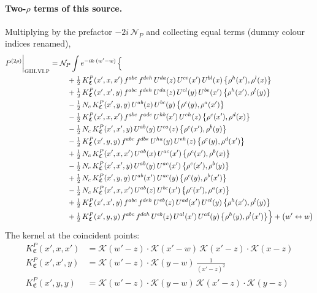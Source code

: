 \documentclass[10pt]{article}
\numberwithin{equation}{section}
\newcommand{\KK}{\mathcal K}
\newcommand{\NP}{\mathcal N_{P}}
\begin{document}
\paragraph{Two-$\rho$ terms of this source.} Multiplying by the prefactor $-2i\,\NP$ and collecting equal terms (dummy colour indices renamed),
\begin{align}
P^{(2\rho)}\bigg|_{\rm GIII.VI.P}={}&\NP\int e^{-ik\cdot(w'-w)}\,\Big\{\notag\\
&\quad +\tfrac12\,K^{P}_{\mathfrak C}(x',x,x')\,f^{abc}\,f^{deh}\,U^{da}(z)\,U^{ce}(x')\,U^{bl}(x)\,\big\{\rho^{h}(x'),\rho^{l}(x)\big\}\notag\\
&\quad +\tfrac12\,K^{P}_{\mathfrak C}(x',x',y)\,f^{abc}\,f^{deh}\,U^{da}(z)\,U^{cl}(y)\,U^{be}(x')\,\big\{\rho^{h}(x'),\rho^{l}(y)\big\}\notag\\
&\quad -\tfrac12\,N_{c}\,K^{P}_{\mathfrak C}(x',y,y)\,U^{ab}(z)\,U^{bc}(y)\,\big\{\rho^{c}(y),\rho^{a}(x')\big\}\notag\\
&\quad -\tfrac12\,K^{P}_{\mathfrak C}(x',x,x')\,f^{abc}\,f^{ade}\,U^{hb}(x')\,U^{eh}(z)\,\big\{\rho^{c}(x'),\rho^{d}(x)\big\}\notag\\
&\quad -\tfrac12\,N_{c}\,K^{P}_{\mathfrak C}(x',x',y)\,U^{ab}(y)\,U^{ca}(z)\,\big\{\rho^{c}(x'),\rho^{b}(y)\big\}\notag\\
&\quad -\tfrac12\,K^{P}_{\mathfrak C}(x',y,y)\,f^{abc}\,f^{dbe}\,U^{ha}(y)\,U^{eh}(z)\,\big\{\rho^{c}(y),\rho^{d}(x')\big\}\notag\\
&\quad +\tfrac12\,N_{c}\,K^{P}_{\mathfrak C}(x',x,x')\,U^{ab}(x)\,U^{ac}(x')\,\big\{\rho^{c}(x'),\rho^{b}(x)\big\}\notag\\
&\quad -\tfrac12\,N_{c}\,K^{P}_{\mathfrak C}(x',x',y)\,U^{ab}(y)\,U^{ac}(x')\,\big\{\rho^{c}(x'),\rho^{b}(y)\big\}\notag\\
&\quad +\tfrac12\,N_{c}\,K^{P}_{\mathfrak C}(x',y,y)\,U^{ab}(x')\,U^{ac}(y)\,\big\{\rho^{c}(y),\rho^{b}(x')\big\}\notag\\
&\quad -\tfrac12\,N_{c}\,K^{P}_{\mathfrak C}(x',x,x')\,U^{ab}(z)\,U^{bc}(x')\,\big\{\rho^{c}(x'),\rho^{a}(x)\big\}\notag\\
&\quad +\tfrac12\,K^{P}_{\mathfrak C}(x',x',y)\,f^{abc}\,f^{deh}\,U^{eb}(z)\,U^{ad}(x')\,U^{cl}(y)\,\big\{\rho^{h}(x'),\rho^{l}(y)\big\}\notag\\
&\quad +\tfrac12\,K^{P}_{\mathfrak C}(x',y,y)\,f^{abc}\,f^{deh}\,U^{eb}(z)\,U^{al}(x')\,U^{cd}(y)\,\big\{\rho^{h}(y),\rho^{l}(x')\big\}\Big\}+\big(w'\leftrightarrow w\big)\label{eq:res-GIII.VI.P}
\end{align}
The kernel at the coincident points:
\begin{align*}
K^{P}_{\mathfrak C}(x',x,x')&=\KK(w'-z)\cdot\KK(x'-w)\,\KK(x'-z)\cdot\KK(x-z)\\K^{P}_{\mathfrak C}(x',x',y)&=\KK(w'-z)\cdot\KK(y-w)\,\frac{1}{(x'-z)^2}\\K^{P}_{\mathfrak C}(x',y,y)&=\KK(w'-z)\cdot\KK(y-w)\,\KK(x'-z)\cdot\KK(y-z)
\end{align*}
\end{document}
